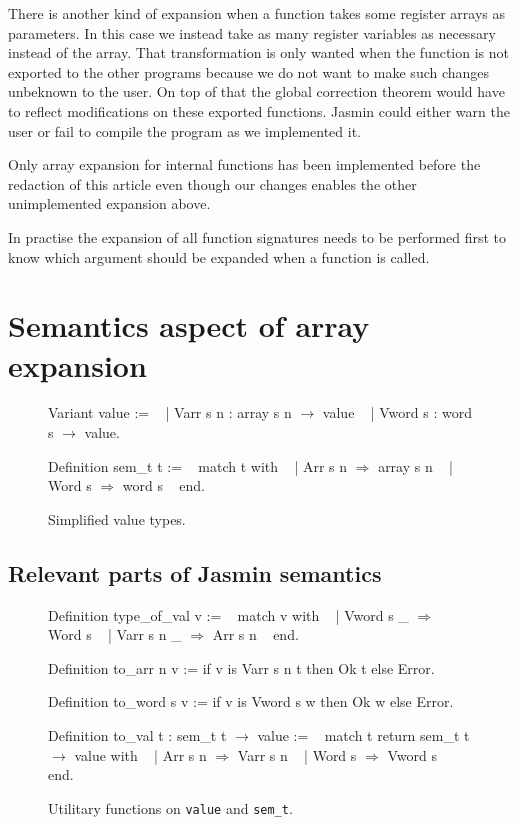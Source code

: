 \documentclass{article}
\begin{document}
\medskip

There is another kind of expansion when a function takes some register arrays as
parameters. In this case we instead take as many register variables as necessary
instead of the array. That transformation is only wanted when the function is
not exported to the other programs because we do not want to make such changes
unbeknown to the user. On top of that the global correction theorem would have
to reflect modifications on these exported functions. Jasmin could either warn
the user or fail to compile the program as we implemented it.

Only array expansion for internal functions has been implemented before the
redaction of this article even though our changes enables the other
unimplemented expansion above.

In practise the expansion of all function signatures needs to be performed first
to know which argument should be expanded when a function is called.


\section{Semantics aspect of array expansion}\label{sec:semantics}

\begin{figure}[t]
\obeylines\obeyspaces\ttfamily%
Variant value :=
~ | Varr s n : array s n \(\rightarrow\) value
~ | Vword s  : word  s   \(\rightarrow\) value.

Definition sem\_t t :=
~ match t with
~ | Arr s n \(\Rightarrow\) array s n
~ | Word s  \(\Rightarrow\) word  s
~ end.
\normalfont%
\caption{Simplified value types.}\label{fig:val}
\end{figure}

\subsection{Relevant parts of Jasmin semantics}

\begin{figure}[t]
\obeylines\obeyspaces\ttfamily%
Definition type\_of\_val v :=
~ match v with
~ | Vword s  \_ \(\Rightarrow\) Word s
~ | Varr s n \_ \(\Rightarrow\) Arr s n
~ end.

Definition to\_arr  n v := if v is Varr s n t then Ok t else Error.

Definition to\_word s v := if v is Vword s  w then Ok w else Error.

Definition to\_val t : sem\_t t \(\rightarrow\) value :=
~ match t return sem\_t t \(\rightarrow\) value with
~ | Arr s n \(\Rightarrow\) Varr s n
~ | Word s  \(\Rightarrow\) Vword s
~ end.
\normalfont%
\caption{Utilitary functions on \texttt{value} and \texttt{sem\_t}.}
\end{figure}
\end{document}
